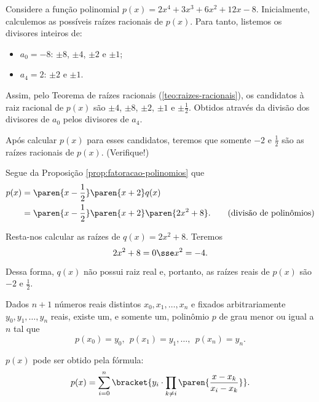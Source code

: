 \begin{solution}
    Considere a função polinomial $p(x) = 2x^4 + 3x^3 + 6x^2 + 12x -8$. Inicialmente, calculemos as possíveis raízes racionais de $p(x)$. Para tanto, listemos os divisores inteiros de:
    \begin{itemize}
        \item $a_0 = -8$: $\pm 8$, $\pm 4$, $\pm 2$ e $\pm 1$;
        \item $a_4 = 2$: $\pm 2$ e $\pm 1$.
    \end{itemize}
    Assim, pelo Teorema de raízes racionais (\ref{teo:raizes-racionais}), os candidatos à raiz racional de $p(x)$ são $\pm 4$, $\pm 8$, $\pm 2$, $\pm 1$ e $\pm \frac 1 2$. Obtidos através da divisão dos divisores de $a_0$ pelos divisores de $a_4$.

    Após calcular $p(x)$ para esses candidatos, teremos que somente $-2$ e $\frac 1 2$ são as raízes racionais de $p(x)$. (Verifique!)

    Segue da Proposição \ref{prop:fatoracao-polinomios} que
    \begin{align*}
        p(x) & = \paren{x - \frac 1 2} \paren{x+2} q(x) \\
            & = \paren{x - \frac 1 2} \paren{x+2} \paren{2x^2 + 8}. \tag{divisão de polinômios}
    \end{align*} 

    Resta-nos calcular as raízes de $q(x) = 2x^2 + 8$. Teremos
    $$2x^2 + 8 = 0 \sse x^2 = -4.$$

    Dessa forma, $q(x)$ não possui raiz real e, portanto, as raízes reais de $p(x)$ são $-2$ e $\frac 1 2$.
\end{solution}

\begin{proposition}
Dados $n+1$ números reais distintos $x_0, x_1 , \dots , x_n$ e
fixados arbitrariamente $y_0, y_1, \dots, y_n$ reais, existe
um, e somente um, polinômio $p$ de grau menor ou igual a $n$ tal que
$$p(x_0) = y_0, \ \ p(x_1) = y_1,  \dots , \ \ p(x_n) = y_n.$$

$p(x)$ pode ser obtido pela fórmula:
$$p(x) = \sum_{i=0}^{n} \bracket{y_i \cdot \prod_{k \neq i} \paren{\frac {x-
x_k}{x_i-x_k}}}.$$
\end{proposition}

\begin{tve}
\end{tve}